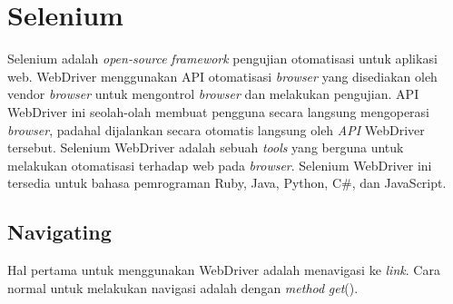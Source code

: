 \section{Selenium}
\label{sec:selenium}
Selenium adalah \textit{open-source} \textit{framework} pengujian otomatisasi untuk aplikasi web\cite{selenium}. WebDriver menggunakan API otomatisasi \textit{browser} yang disediakan oleh vendor \textit{browser} untuk mengontrol \textit{browser} dan melakukan pengujian. API WebDriver ini seolah-olah membuat pengguna secara langsung mengoperasi \textit{browser}, padahal dijalankan secara otomatis langsung oleh \textit{API} WebDriver tersebut. Selenium WebDriver adalah sebuah \textit{tools} yang berguna untuk melakukan otomatisasi terhadap web pada \textit{browser}. Selenium WebDriver ini tersedia untuk bahasa pemrograman Ruby, Java, Python, C\#, dan JavaScript.

\subsection{Navigating}
Hal pertama untuk menggunakan WebDriver adalah menavigasi ke \textit{link}. Cara normal untuk melakukan navigasi adalah dengan \textit{method} \textit{get}().

